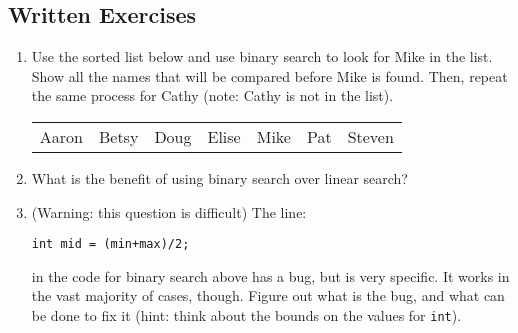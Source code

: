 \subsection{Written Exercises}

\setcounter{counter}{1}
\begin{enumerate}[label={\arabic{counter}\addtocounter{counter}{1}}.]

\item Use the sorted list below and use binary search to look for Mike in the list. Show all the names that will be compared before Mike is found. Then, repeat the same process for Cathy (note: Cathy is not in the list).
\begin{table}[h]
\begin{tabular}{lllllll}
Aaron & Betsy & Doug & Elise & Mike & Pat & Steven
\end{tabular}
\end{table}

\item What is the benefit of using binary search over linear search?

\item (Warning: this question is difficult) The line:
\begin{lstlisting}
int mid = (min+max)/2;
\end{lstlisting}
in the code for binary search above has a bug, but is very specific. It works in the vast majority of cases, though. Figure out what is the bug, and what can be done to fix it (hint: think about the bounds on the values for \verb|int|).

\end{enumerate}